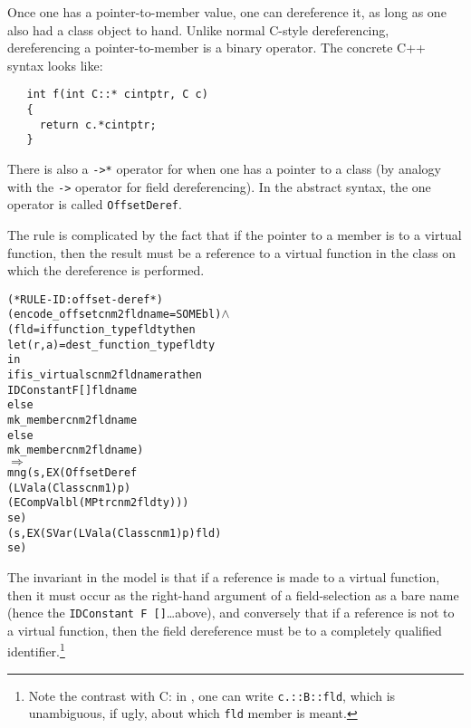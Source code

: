 \documentclass[11pt]{article}
\begin{document}
\bigskip\noindent
Once one has a pointer-to-member value, one can dereference it, as
long as one also had a class object to hand.  Unlike normal C-style
dereferencing, dereferencing a pointer-to-member is a binary
operator.  The concrete C++ syntax looks like:
\begin{verbatim}
   int f(int C::* cintptr, C c)
   {
     return c.*cintptr;
   }
\end{verbatim}
There is also a \texttt{->*} operator for when one has a pointer to a
class (by analogy with the \texttt{->} operator for field
dereferencing).  In the abstract syntax, the one operator is called
\texttt{OffsetDeref}.

The rule is complicated by the fact that if the pointer to a member is
to a virtual function, then the result must be a reference to a
virtual function in the class on which the dereference is
performed.
\begin{center}
\begin{minipage}{\textwidth}
%
\begin{alltt}
(* RULE-ID: offset-deref *)
     (encode_offset cnm2 fldname = SOME bl) \(\land\)
     (fld = if function_type fldty then
              let (r,a) = dest_function_type fldty
              in
                if is_virtual s cnm2 fldname r a then
                  IDConstant F [] fldname
                else
                  mk_member cnm2 fldname
            else
              mk_member cnm2 fldname)
   \(\Rightarrow\)
     mng (s, EX (OffsetDeref
                     (LVal a (Class cnm1) p)
                     (ECompVal bl (MPtr cnm2 fldty)))
                se)
         (s, EX (SVar (LVal a (Class cnm1) p) fld)
                se)
\end{alltt}
\end{minipage}
\end{center}
The invariant in the model is that if a reference is made to a virtual
function, then it must occur as the right-hand argument of a
field-selection as a bare name (hence the
\texttt{IDConstant~F~[]}\dots above), and conversely that if a
reference is not to a virtual function, then the field dereference
must be to a completely qualified identifier.\footnote{Note the
  contrast with C: in \cpp, one can write \texttt{c.::B::fld}, which
  is unambiguous, if ugly, about which \texttt{fld} member is meant.}
\end{document}
